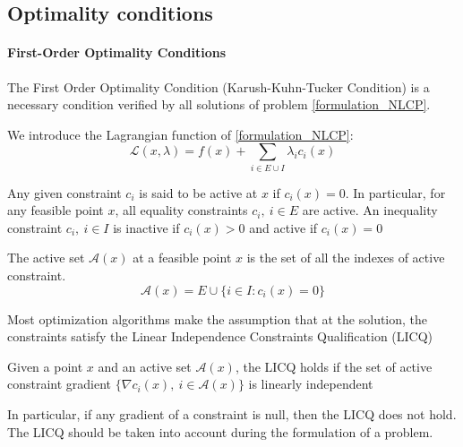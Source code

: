 \subsection{Optimality conditions}

\paragraph{First-Order Optimality Conditions}

The First Order Optimality Condition (Karush-Kuhn-Tucker Condition) is a necessary condition verified by all solutions of problem \ref{formulation_NLCP}.

We introduce the Lagrangian function of \ref{formulation_NLCP}:
\begin{equation}
  \mathcal{L}(x,\lambda) = f(x) + \sum_{i\in E\cup I}\lambda_i c_i(x)
\end{equation}

Any given constraint $c_i$ is said to be active at $x$ if $c_i(x)=0$.
In particular, for any feasible point $x$, all equality constraints $c_i,\ i\in E$ are active. 
An inequality constraint $c_i,\ i\in I$ is inactive if $c_i(x)>0$ and active if $c_i(x) = 0$

\begin{definition}  
  \label{active_set}
  The active set $\mathcal{A}(x)$ at a feasible point $x$ is the set of all the indexes of active constraint.
  \begin{equation}
    \mathcal{A}(x)=E\cup\{i\in I: c_i(x) = 0\}
  \end{equation}
\end{definition}

Most optimization algorithms make the assumption that at the solution, the constraints satisfy the Linear Independence Constraints Qualification (LICQ)

\begin{definition}
  Given a point $x$ and an active set $\mathcal{A}(x)$, the LICQ holds if the set of active constraint gradient $\{\nabla c_i(x),\ i\in \mathcal{A}(x)\}$ is linearly independent
\end{definition}

In particular, if any gradient of a constraint is null, then the LICQ does not hold. 
The LICQ should be taken into account during the formulation of a problem.

